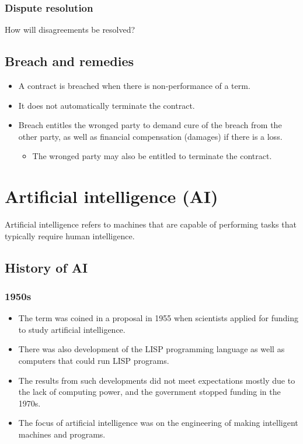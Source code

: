 \documentclass[11pt]{article}
\begin{document}
\subsubsection{Dispute resolution}
\label{sec:orgf83e6f2}
How will disagreements be resolved?

\subsection{Breach and remedies}
\label{sec:org0cb1c40}
\begin{itemize}
\item A contract is breached when there is non-performance of a term.
\item It does not automatically terminate the contract.
\item Breach entitles the wronged party to demand cure of the breach from the other party, as well as financial compensation (damages) if there is a loss.
\begin{itemize}
\item The wronged party may also be entitled to terminate the contract.
\end{itemize}
\end{itemize}

 \newpage

\section{Artificial intelligence (AI)}
\label{sec:orgc9626c8}
Artificial intelligence refers to machines that are capable of performing tasks that typically require human intelligence.

\subsection{History of AI}
\label{sec:org25b852c}

\subsubsection{1950s}
\label{sec:org1d14d6b}
\begin{itemize}
\item The term was coined in a proposal in 1955 when scientists applied for funding to study artificial intelligence.
\item There was also development of the LISP programming language as well as computers that could run LISP programs.
\item The results from such developments did not meet expectations mostly due to the lack of computing power, and the government stopped funding in the 1970s.
\item The focus of artificial intelligence was on the engineering of making intelligent machines and programs.
\end{itemize}
\end{document}
